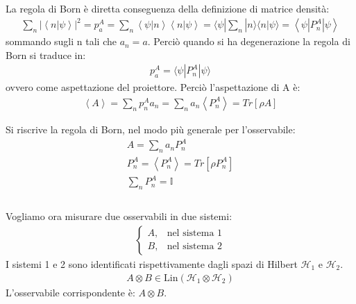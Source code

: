 La regola di Born è diretta conseguenza della definizione di matrice densità:
\begin{equation}\begin{split}
\sum_{n}|\left\langle n|\psi\right\rangle|^{2}=p_a^A=\sum_{n}\left\langle\psi|n\right\rangle\left\langle n|\psi\right\rangle=\langle\psi|\sum_n|n\rangle\langle n|\psi\rangle=\left\langle\psi|P_n^A|\psi\right\rangle
\end{split}\end{equation}
sommando sugli n tali che $a_n = a$. Perciò quando si ha degenerazione la regola di Born si traduce in:
\begin{equation}\begin{split}
p_a^A = \langle\psi|P_n^A|\psi \rangle
\end{split}\end{equation}
ovvero come aspettazione del proiettore.
Perciò l'aspettazione di A è:
\begin{equation}\begin{split}
\left\langle A\right\rangle=\sum_n{p_n^Aa_n}=\sum_n a_n\left\langle P_n^A\right\rangle=Tr\left[\rho A\right]
\end{split}\end{equation}

Si riscrive la regola di Born, nel modo più generale per l'osservabile:
\begin{equation}\begin{split}
A=\sum_n{a_nP_n^A} \\
P_n^A=\left\langle P_n^A \right\rangle=Tr\left[\rho P_n^A\right]\\
\sum_n{P_n^A}=\mathbb{I} \\ \\
\end{split}\end{equation}

Vogliamo ora misurare due osservabili in due sistemi:
\begin{equation}\begin{split}
\begin{cases}
A, & \textrm{nel sistema 1}\\
B, & \textrm{nel sistema 2}
\end{cases}
\end{split}\end{equation}
I sistemi 1 e 2 sono identificati rispettivamente dagli spazi di Hilbert $\mathcal{H}_1$ e $\mathcal{H}_2$.
\begin{equation}\begin{split}
A\otimes B\in \textrm{Lin}\left(\mathcal{H}_1\otimes \mathcal{H}_2\right)
\end{split}\end{equation}
L'osservabile corrispondente è: $A\otimes B$.

